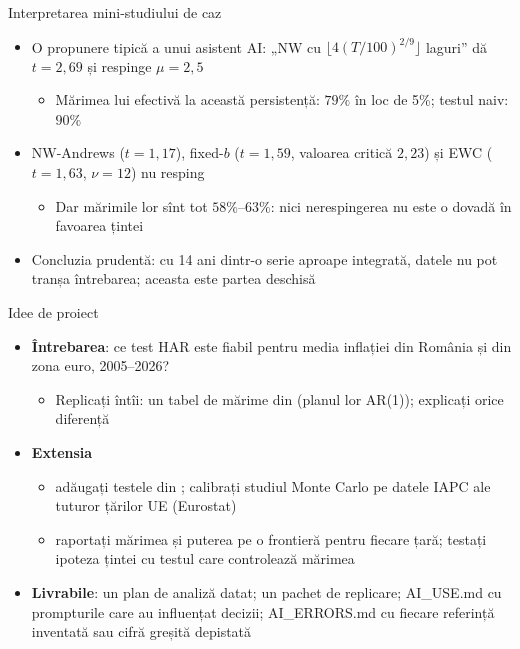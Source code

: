 \begin{frame}{Interpretarea mini-studiului de caz}
\itemsize{\footnotesize}
\begin{itemize}
    \item O propunere tipică a unui asistent AI: „NW cu $\lfloor 4(T/100)^{2/9}\rfloor$ laguri” dă $t = 2{,}69$ și respinge $\mu = 2{,}5$
    \begin{itemize}
        \item Mărimea lui efectivă la această persistență: $79\%$ în loc de 5\%; testul naiv: $90\%$
    \end{itemize}
    \item NW-Andrews ($t = 1{,}17$), fixed-$b$ ($t = 1{,}59$, valoarea critică $2{,}23$) și EWC ($t = 1{,}63$, $\nu = 12$) nu resping
    \begin{itemize}
        \item Dar mărimile lor sînt tot $58\%$--$63\%$: nici nerespingerea nu este o dovadă în favoarea țintei
    \end{itemize}
    \item Concluzia prudentă: cu 14 ani dintr-o serie aproape integrată, datele nu pot tranșa întrebarea; aceasta este partea deschisă
\end{itemize}
\end{frame}

\begin{frame}{Idee de proiect}
\itemsize{\footnotesize}
\begin{itemize}
    \item \textbf{Întrebarea}: ce test HAR este fiabil pentru media inflației din România și din zona euro, 2005--2026?
    \begin{itemize}
        \item Replicați întîi: un tabel de mărime din  (planul lor AR(1)); explicați orice diferență
    \end{itemize}
    \item \textbf{Extensia}
    \begin{itemize}
        \item adăugați testele din ; calibrați studiul Monte Carlo pe datele IAPC ale tuturor țărilor UE (Eurostat)
        \item raportați mărimea și puterea pe o frontieră pentru fiecare țară; testați ipoteza țintei cu testul care controlează mărimea
    \end{itemize}
    \item \textbf{Livrabile}: un plan de analiză datat; un pachet de replicare; AI\_USE.md cu prompturile care au influențat decizii; AI\_ERRORS.md cu fiecare referință inventată sau cifră greșită depistată
\end{itemize}
\end{frame}


